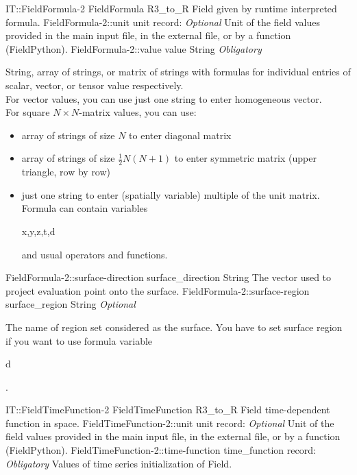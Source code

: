 \begin{RecordType}
	{IT::FieldFormula-2}
	{FieldFormula}
	{}%
	{}%
	{{{R3{\_}to{\_}R Field given by runtime interpreted formula.}%
}}
		\RecKey
			{FieldFormula-2::unit}
			{unit}
			{{record: }}{}
			{ \it{Optional}}
			{{{Unit of the field values provided in the main input file, in the external file, or by a function (FieldPython).}%
}}
		\RecKey
			{FieldFormula-2::value}
			{value}
			{{String}}{}
			{ \it{Obligatory}}
			{{{{String, array of strings, or matrix of strings with formulas for individual entries of scalar, vector, or tensor value respectively.}\\{
For vector values, you can use just one string to enter homogeneous vector.}\\{
For square }{$N\times N$}{-matrix values, you can use:}
% 
}
\begin{itemize}
\item {array of strings of size }{$N$}{ to enter diagonal matrix}
\item {array of strings of size }{$\frac12N(N+1)$}{ to enter symmetric matrix (upper triangle, row by row)}
\item {just one string to enter (spatially variable) multiple of the unit matrix.}\\{
Formula can contain variables }\begin{ttfamily}x,y,z,t,d\end{ttfamily}{ and usual operators and functions.}
\end{itemize}
}}
		\RecKey
			{FieldFormula-2::surface-direction}
			{surface{\_}direction}
			{{String}}{}
			{ }
			{{{The vector used to project evaluation point onto the surface.}%
}}
		\RecKey
			{FieldFormula-2::surface-region}
			{surface{\_}region}
			{{String}}{}
			{ \it{Optional}}
			{{{The name of region set considered as the surface.
You have to set surface region if you want to use formula variable }\begin{ttfamily}d\end{ttfamily}{.}%
}}
\end{RecordType}
\begin{RecordType}
	{IT::FieldTimeFunction-2}
	{FieldTimeFunction}
	{}%
	{}%
	{{{R3{\_}to{\_}R Field time-dependent function in space.}%
}}
		\RecKey
			{FieldTimeFunction-2::unit}
			{unit}
			{{record: }}{}
			{ \it{Optional}}
			{{{Unit of the field values provided in the main input file, in the external file, or by a function (FieldPython).}%
}}
		\RecKey
			{FieldTimeFunction-2::time-function}
			{time{\_}function}
			{{record: }}{}
			{ \it{Obligatory}}
			{{{Values of time series initialization of Field.}%
}}
\end{RecordType}
